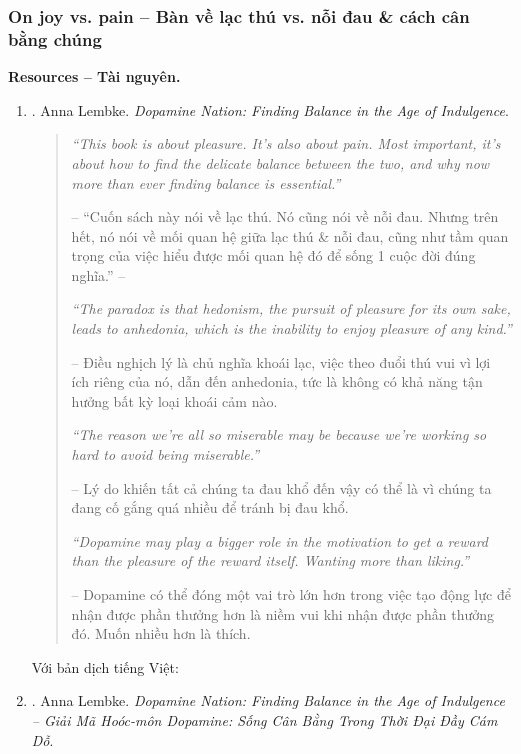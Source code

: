 \documentclass[12pt]{article}
\begin{document}
\subsubsection{On joy vs. pain -- Bàn về lạc thú vs. nỗi đau \& cách cân bằng chúng}
\textbf{\textsf{Resources -- Tài nguyên.}}
\begin{enumerate}
	\item \cite{Lembke_dopamine}. {\sc Anna Lembke}. {\it Dopamine Nation: Finding Balance in the Age of Indulgence}.
	\begin{quotation}
		{\it``This book is about pleasure. It's also about pain. Most important, it's about how to find the delicate balance between the two, and why now more than ever finding balance is essential.''}
		
		-- ``Cuốn sách này nói về lạc thú. Nó cũng nói về nỗi đau. Nhưng trên hết, nó nói về mối quan hệ giữa lạc thú \& nỗi đau, cũng như tầm quan trọng của việc hiểu được mối quan hệ đó để sống 1 cuộc đời đúng nghĩa.'' -- \cite[p. 9]{Lembke_dopamine_VN}
		
		{\it``The paradox is that hedonism, the pursuit of pleasure for its own sake, leads to anhedonia, which is the inability to enjoy pleasure of any kind.''}
		
		-- Điều nghịch lý là chủ nghĩa khoái lạc, việc theo đuổi thú vui vì lợi ích riêng của nó, dẫn đến anhedonia, tức là không có khả năng tận hưởng bất kỳ loại khoái cảm nào.
		
		{\it``The reason we're all so miserable may be because we're working so hard to avoid being miserable.''}
		
		-- Lý do khiến tất cả chúng ta đau khổ đến vậy có thể là vì chúng ta đang cố gắng quá nhiều để tránh bị đau khổ.
		
		{\it``Dopamine may play a bigger role in the motivation to get a reward than the pleasure of the reward itself. Wanting more than liking.''}
		
		-- Dopamine có thể đóng một vai trò lớn hơn trong việc tạo động lực để nhận được phần thưởng hơn là niềm vui khi nhận được phần thưởng đó. Muốn nhiều hơn là thích.
	\end{quotation}
	Với bản dịch tiếng Việt:	
	\item \cite{Lembke_dopamine_VN}. {\sc Anna Lembke}. {\it Dopamine Nation: Finding Balance in the Age of Indulgence -- Giải Mã Hoóc-môn Dopamine: Sống Cân Bằng Trong Thời Đại Đầy Cám Dỗ}.
\end{enumerate}
\end{document}
